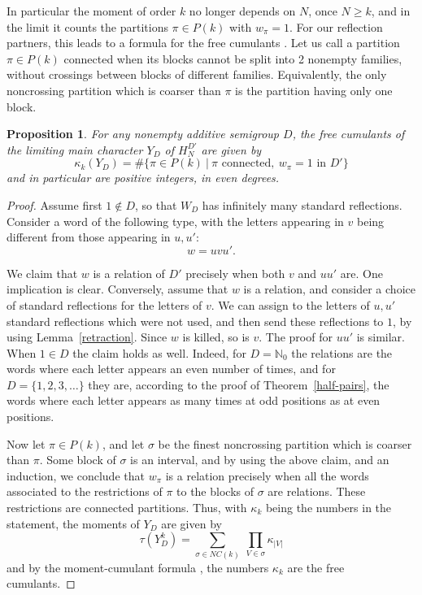 \documentclass[11pt,a4paper]{article}
\newtheorem{prop}[thm]{Proposition}
\begin{document}
In particular the moment of order $k$ no longer depends on $N$, once $N\geq k$, and in the limit it counts the partitions $\pi\in P(k)$ with $w_\pi=1$. For our reflection partners, this leads to a formula for the free cumulants \cite{ns,free-cumulants}. Let us call a partition $\pi\in P(k)$ connected when its blocks cannot be split into 2 nonempty families, without crossings between blocks of different families. Equivalently, the only noncrossing partition which is coarser than $\pi$ is the partition having only one block.

\begin{prop}\label{cumulants}
For any nonempty additive semigroup $D$, the free cumulants of the limiting main character $Y_D$ of $H_N^{D'}$ are given by
\[
 \kappa_k(Y_D)=\#\Big\{\pi\in P(k)\ \Big|\ \pi\text{ connected},\ w_\pi=1\text{ in }D'\Big\}
\]
and in particular are positive integers, in even degrees.
\end{prop}

\begin{proof}
Assume first $1\notin D$, so that $W_D$ has infinitely many standard reflections. Consider a word of the following type, with the letters appearing in $v$ being different from those appearing in $u,u'$:
\[
 w=uvu'.
\]

We claim that $w$ is a relation of $D'$ precisely when both $v$ and $uu'$ are. One implication is clear. Conversely, assume that $w$ is a relation, and consider a choice of standard reflections for the letters of $v$. We can assign to the letters of $u,u'$ standard reflections which were not used, and then send these reflections to $1$, by using Lemma~\ref{retraction}. Since $w$ is killed, so is $v$. The proof for $uu'$ is similar. When $1\in D$ the claim holds as well. Indeed, for $D=\mathbb N_0$ the relations are the words where each letter appears an even number of times, and for $D=\{1,2,3,\ldots\}$ they are, according to the proof of Theorem~\ref{half-pairs}, the words where each letter appears as many times at odd positions as at even positions.

Now let $\pi\in P(k)$, and let $\sigma$ be the finest noncrossing partition which is coarser than $\pi$. Some block of $\sigma$ is an interval, and by using the above claim, and an induction, we conclude that $w_\pi$ is a relation precisely when all the words associated to the restrictions of $\pi$ to the blocks of $\sigma$ are relations. These restrictions are connected partitions. Thus, with $\kappa_k$ being the numbers in the statement, the moments of $Y_D$ are given by
\[
 \tau(Y_D^k)=\sum_{\sigma\in NC(k)}\ \prod_{V\in\sigma}\kappa_{|V|}
\]
and by the moment-cumulant formula \cite{ns,free-cumulants}, the numbers $\kappa_k$ are the free cumulants.
\end{proof}
\end{document}
